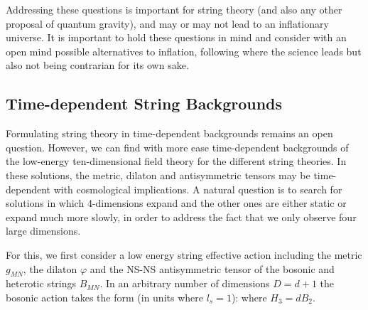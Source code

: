Addressing these questions is important for string theory (and also any other proposal of quantum gravity), and may or may not lead to an inflationary universe. It is important to hold these questions in mind and consider with an open mind possible alternatives to inflation, following where the science leads but also not being contrarian for its own sake.

\subsection{Time-dependent String Backgrounds}

Formulating string theory in time-dependent backgrounds remains an open question. However, we can find with more ease time-dependent backgrounds 
of the low-energy ten-dimensional field theory for the different string theories. In these solutions, the metric, dilaton and antisymmetric tensors may be time-dependent with cosmological implications. A natural question is to search for solutions in which 4-dimensions expand and the other ones are either 
static or expand much more slowly, in order to address the fact that we only observe four large dimensions.

For this, we first consider 
a low energy string effective action including the metric $g_{MN}$, 
the dilaton $\varphi$ and the NS-NS antisymmetric tensor of the bosonic and heterotic strings $B_{MN}$. In an arbitrary number of dimensions $D=d+1$
the bosonic action takes the form (in units where $l_s = 1$):
\be
\setlength\fboxsep{0.25cm}
\setlength\fboxrule{0.4pt}
\ee
where  $H_3=dB_2$. 

